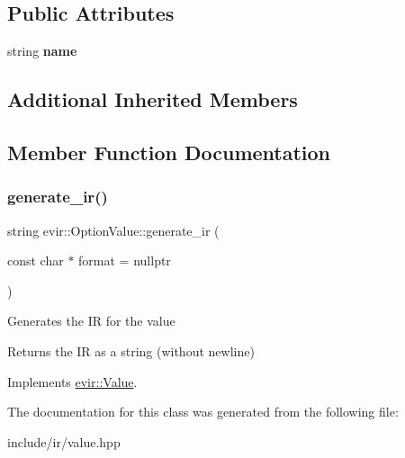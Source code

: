 \subsection*{Public Attributes}
\begin{DoxyCompactItemize}
\item 
\mbox{\label{classevir_1_1OptionValue_a63f37acb5bd04ab6c2dd9ddb78e70318}} 
string {\bfseries name}
\end{DoxyCompactItemize}
\subsection*{Additional Inherited Members}


\subsection{Member Function Documentation}
\mbox{\label{classevir_1_1OptionValue_a8bd21c46fc29805637eed4473f1fa371}} 
\subsubsection{\texorpdfstring{generate\+\_\+ir()}{generate\_ir()}}
{\footnotesize\ttfamily string evir\+::\+Option\+Value\+::generate\+\_\+ir (\begin{DoxyParamCaption}\item[{const char $\ast$}]{format = {\ttfamily nullptr} }\end{DoxyParamCaption})\hspace{0.3cm}{\ttfamily [virtual]}}

Generates the IR for the value \begin{DoxyReturn}{Returns}
the IR as a string (without newline) 
\end{DoxyReturn}


Implements \hyperlink{classevir_1_1Value_a3e7e5bc634fd5bba528324076fe2a763}{evir\+::\+Value}.



The documentation for this class was generated from the following file\+:\begin{DoxyCompactItemize}
\item 
include/ir/value.\+hpp\end{DoxyCompactItemize}
